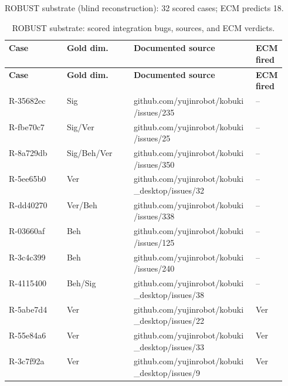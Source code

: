 \noindent ROBUST substrate (blind reconstruction): 32 scored cases; ECM predicts 18.
\begin{longtable}{@{}ll>{\raggedright\arraybackslash}p{0.44\linewidth}>{\raggedright\arraybackslash}p{0.11\linewidth}@{}}
\caption{ROBUST substrate: scored integration bugs, sources, and ECM verdicts.}\label{tab:ledger_robust}\\
\toprule
\textbf{Case} & \textbf{Gold dim.} & \textbf{Documented source} & \textbf{ECM fired} \\
\midrule\endfirsthead
\toprule \textbf{Case} & \textbf{Gold dim.} & \textbf{Documented source} & \textbf{ECM fired} \\ \midrule\endhead
\bottomrule\endfoot
R-35682ec & Sig & {\scriptsize\ttfamily github.com/\allowbreak{}yujinrobot/\allowbreak{}kobuki/\allowbreak{}issues/\allowbreak{}235} & -- \\
R-fbe70c7 & Sig/Ver & {\scriptsize\ttfamily github.com/\allowbreak{}yujinrobot/\allowbreak{}kobuki/\allowbreak{}issues/\allowbreak{}25} & -- \\
R-8a729db & Sig/Beh/Ver & {\scriptsize\ttfamily github.com/\allowbreak{}yujinrobot/\allowbreak{}kobuki/\allowbreak{}issues/\allowbreak{}350} & -- \\
R-5ee65b0 & Ver & {\scriptsize\ttfamily github.com/\allowbreak{}yujinrobot/\allowbreak{}kobuki\_desktop/\allowbreak{}issues/\allowbreak{}32} & -- \\
R-dd40270 & Ver/Beh & {\scriptsize\ttfamily github.com/\allowbreak{}yujinrobot/\allowbreak{}kobuki/\allowbreak{}issues/\allowbreak{}338} & -- \\
R-03660af & Beh & {\scriptsize\ttfamily github.com/\allowbreak{}yujinrobot/\allowbreak{}kobuki/\allowbreak{}issues/\allowbreak{}125} & -- \\
R-3c4c399 & Beh & {\scriptsize\ttfamily github.com/\allowbreak{}yujinrobot/\allowbreak{}kobuki/\allowbreak{}issues/\allowbreak{}240} & -- \\
R-4115400 & Beh/Sig & {\scriptsize\ttfamily github.com/\allowbreak{}yujinrobot/\allowbreak{}kobuki\_desktop/\allowbreak{}issues/\allowbreak{}38} & -- \\
R-5abe7d4 & Ver & {\scriptsize\ttfamily github.com/\allowbreak{}yujinrobot/\allowbreak{}kobuki\_desktop/\allowbreak{}issues/\allowbreak{}22} & Ver \\
R-55e84a6 & Ver & {\scriptsize\ttfamily github.com/\allowbreak{}yujinrobot/\allowbreak{}kobuki\_desktop/\allowbreak{}issues/\allowbreak{}33} & Ver \\
R-3c7f92a & Ver & {\scriptsize\ttfamily github.com/\allowbreak{}yujinrobot/\allowbreak{}kobuki\_desktop/\allowbreak{}issues/\allowbreak{}9} & Ver \\

\end{longtable}

